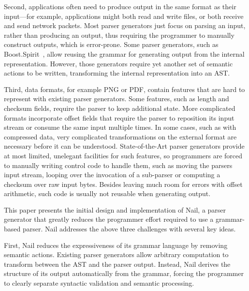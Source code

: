 Second,  applications often need to produce output in the same
format as their input---for example, applications might both
read and write files, or both receive and send network packets.
Most parser generators just focus on parsing an input, rather
than producing an output, thus requiring the programmer to manually
construct outputs, which is error-prone.  Some parser generators, such as
Boost.Spirit~\cite{boost-spirit},
allow reusing the grammar for generating output from the internal
representation.  However, those generators require yet another set of
semantic actions to be written, transforming the internal representation
into an AST\@.


Third, data formats, for example PNG or PDF, contain features that are hard to represent with
existing parser generators. Some features, such as length and checksum fields, require the parser to
keep additional state. More complicated formats incorporate offset fields that require the parser to
reposition its input stream or consume the same input multiple times. In some cases, such as with
compressed data, very complicated transformations on the external format are necessary before it can
be understood. State-of-the-Art parser generators provide at most limited, unelegant facilities for
such features, so programmers are forced to manually writing control code to handle them, such as
moving the parsers input stream, looping over the invocation of a sub-parser or computing a checksum
over raw input bytes. Besides leaving much room for errors with offset arithmetic, such code is
usually not reusable when generating output.


This paper presents the initial design and implementation of Nail, a parser
generator that greatly reduces the programmer effort required to use a
grammar-based parser. Nail addresses the above three challenges with several key
ideas.

First, Nail reduces the expressiveness of its grammar language by removing
semantic actions. Existing parser generators allow arbitrary computation to
transform between the AST and the parser output. Instead, Nail derives the
structure of its output automatically from the grammar, forcing the programmer
to clearly separate syntactic validation and semantic processing.

